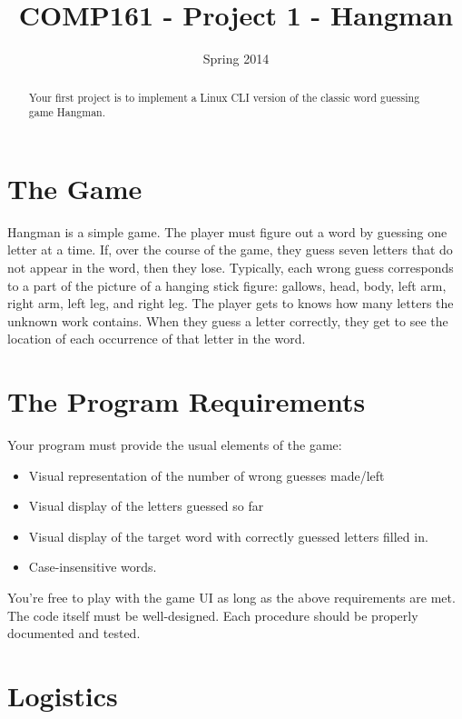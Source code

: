 \documentclass[]{tufte-handout}
\title{COMP161 - Project 1 - Hangman}
\author{}
\date{Spring 2014}
\begin{document}
\maketitle

\begin{abstract}
Your first project is to implement a Linux CLI version of the classic word guessing game Hangman.
\end{abstract}

\section{The Game}

Hangman is a simple game. The player must figure out a word by guessing one letter at a time.  If, over the course of the game, they guess seven letters that do not appear in the word, then they lose.  Typically, each wrong guess corresponds to a part of the picture of a hanging stick figure: gallows, head, body, left arm, right arm, left leg, and right leg.  The player gets to knows how many letters the unknown work contains. When they guess a letter correctly, they get to see the location of each occurrence of that letter in the word.  

\section{The Program Requirements}

Your program must provide the usual elements of the game:
\begin{itemize}
\item Visual representation of the number of wrong guesses made/left
\item Visual display of the letters guessed so far
\item Visual display of the target word with correctly guessed letters filled in.
\item Case-insensitive words.
\end{itemize}
You're free to play with the game UI as long as the above requirements are met. The code itself must be well-designed. Each procedure should be properly documented and tested. 

\section{Logistics}
\end{document}
